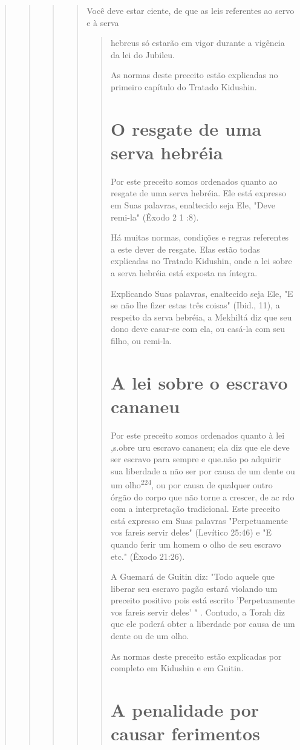 \begin{quote}
\begin{quote}
\begin{quote}
\begin{quote}
Você deve estar ciente, de que as leis referentes ao servo e à serva

\begin{quote}hebreus só estarão em vigor durante a vigência da lei do Jubileu.

As normas deste preceito estão explicadas no primeiro capítulo do
Tratado Kidushin.

\section{O resgate de uma serva hebréia}

Por este preceito somos ordenados quanto ao resgate de uma serva
hebréia. Ele está expresso em Suas palavras, enaltecido seja Ele, "Deve
remi-la" (Êxodo 2 1 :8).

Há muitas normas, condições e regras referentes a este dever de
res­gate. Elas estão todas explicadas no Tratado Kidushin, onde a lei
sobre a serva hebréia está exposta na íntegra.

Explicando Suas palavras, enaltecido seja Ele, "E se não lhe fizer
es­tas três coisas" (Ibid., 11), a respeito da serva hebréia, a Mekhiltá
diz que seu dono deve casar-se com ela, ou casá-la com seu filho, ou
remi-la.

\section{A lei sobre o escravo cananeu}

Por este preceito somos ordenados quanto à lei ,s.obre
uru escravo cananeu; ela diz que ele deve ser escravo para sempre e
que.não po adquirir sua liberdade a não ser por causa
de um dente ou um olho\textsuperscript{224}, ou por causa de qualquer
outro órgão do corpo que não torne a crescer, de ac rdo com a
interpretação tradicional. Este preceito está expresso em Suas palavras
"Perpe­tuamente vos fareis servir deles" (Levítico 25:46) e "E quando
ferir um homem o olho de seu escravo etc." (Êxodo 21:26).

A Guemará de Guitin diz: "Todo aquele que liberar seu escravo pa­gão
estará violando um preceito positivo pois está escrito 'Perpetuamente
vos fareis servir deles' " . Contudo, a Torah diz que ele poderá obter a
liberdade por causa de um dente ou de um olho.

As normas deste preceito estão explicadas por completo em Kidus­hin e em
Guitin.

\section{A penalidade por causar ferimentos}


\end{quote}
\end{quote}
\end{quote}
\end{quote}
\end{quote}
